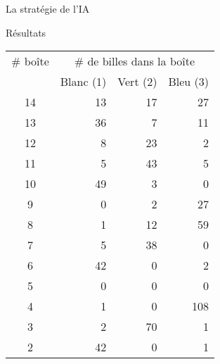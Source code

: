 \documentclass[serif]{beamer} %
\theoremstyle{definition}
\theoremstyle{remark}
\begin{document}
\begin{frame}{La stratégie de l'IA}
%	
\end{frame}

\begin{frame}{Résultats}
	\begin{table}[]
		\centering
		\label{my-label}
		\begin{tabular}{crrr}
			\# boîte & \multicolumn{3}{c}{\# de billes dans la boîte} \\
			& Blanc (1)      & Vert (2)      & Bleu (3)      \\
			14&                13&               17&      27         \\
			13&                36&               7&        11       \\
			12&                8&               23&         2      \\
			11&                5&               43&         5      \\
			10&                49&               3&         0      \\
			9&                0&               2&           27    \\
			8&                1&               12&           59    \\
			7&                5&               38&         0      \\
			6&                42&               0&         2      \\
			5&                0&               0&          0     \\
			4&                1&               0&          108     \\
			3&                2&               70&           1    \\
			2&                42&               0&           1   
		\end{tabular}
	\end{table}
\end{frame}
\end{document}
